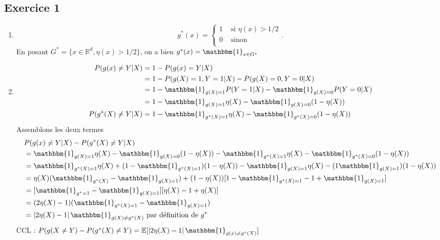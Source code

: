 \documentclass{article}
\theoremstyle{plain}%
\theoremstyle{definition}
\theoremstyle{remark}
\begin{document}
\subsection{Exercice 1}
\begin{enumerate}
    \item 
    \[
        g^* (x) = \begin{cases}
            1 &\text{ si } \eta (x) > 1/2\\
            0 &\text{ sinon }\\
        \end{cases} 
    .\]
    En posant $ G^* = \{x \in \mathbb{R} ^d, \eta (x) > 1/2 \} $, on a bien $ g^*(x) = \mathbbm{1}_{x \in G^*} $ 
    
    \item \begin{align*}
        P(g(x) \neq  Y | X) &= 1 - P(g(x) = Y | X) \\
            &= 1 - P(g(X) = 1, Y = 1 | X) - P (g(X) = 0, Y = 0 | X) \\
            &= 1 - \mathbbm{1}_{g(X) = 1} P (Y = 1 | X) - \mathbbm{1}_{g(X) = 0}P(Y = 0 | X) \\
            &= 1 - \mathbbm{1}_{g(X) = 1} \eta (X) - \mathbbm{1}_{g(X) = 0} (1 - \eta (X)) \\
        P( g^* (X) \neq  Y | X) &= 1 - \mathbbm{1}_{g^*(X) = 1} \eta (X) - \mathbbm{1}_{g^* (X) = 0 } (1 - \eta (X)) \\
    \end{align*}
    Assemblons les deux termes 
    \begin{align*}
        & P(g(x) \neq  Y | X) - P( g^* (X) \neq  Y | X) \\ 
            &= \mathbbm{1}_{g(X) = 1} \eta (X) - \mathbbm{1}_{g(X) = 0} (1 - \eta (X)) - \mathbbm{1}_{g^*(X) = 1} \eta (X) - \mathbbm{1}_{g^* (X) = 0 } (1 - \eta (X)) \\
            &= \mathbbm{1}_{g^*(X) = 1} \eta (X) + (1 - \mathbbm{1}_{g^* (X) =1})(1 - \eta (X)) - \mathbbm{1}_{g(X) = 1} \eta (X) - (1  \mathbbm{1}_{g(X) = 1} )(1 - \eta (X)) \\
            &= \eta (X) (\mathbbm{1}_{g^* (X)} - \mathbbm{1}_{g(X) =1}) + (1 - \eta (X) ) [ 1 - \mathbbm{1}_{g^* (X) = 1} - 1 + \mathbbm{1}_{g(X) = 1}] \\
            &= [\mathbbm{1}_{g^* = 1} - \mathbbm{1}_{g(X) = 1}] [ \eta (X) - 1 + \eta (X)] \\
            &= (2 \eta (X) - 1) (\mathbbm{1}_{g^*(X) = 1} - \mathbbm{1}_{g(X) = 1}) \\
            &= \left| 2 \eta (X) - 1 \right|  \mathbbm{1}_{g(X) \neq  g^*(X)} \text{ par définition de } g^*
    \end{align*}
    CCL : $ P(g(X \neq  Y) - P(g^* (X) \neq Y) = \mathbb{E} [ \left| 2 \eta (X) - 1 \right| \mathbbm{1}_{g(x) \neq  g^*(X)}]$ 
    

\end{enumerate}
\end{document}
